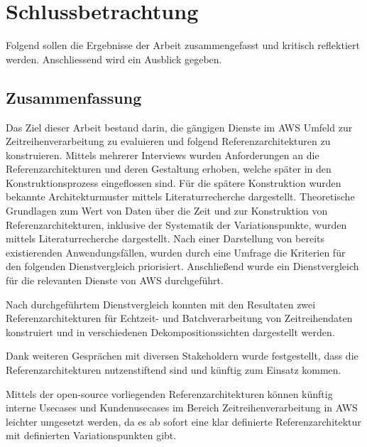 \chapter{Schlussbetrachtung}\label{chapter:Schlussbetrachtun}
Folgend sollen die Ergebnisse der Arbeit zusammengefasst und kritisch reflektiert werden. Anschliessend wird ein Ausblick gegeben.
\section{Zusammenfassung}\label{section:Zusammenfassun}
Das Ziel dieser Arbeit bestand darin, die gängigen Dienste im \ac{AWS} Umfeld zur Zeitreihenverarbeitung zu evaluieren und folgend Referenzarchitekturen zu konstruieren. Mittels mehrerer Interviews wurden Anforderungen an die Referenzarchitekturen und deren Gestaltung erhoben, welche später in den Konstruktionsprozess eingeflossen sind. 
Für die spätere Konstruktion wurden bekannte Architekturmuster mittels Literaturrecherche dargestellt. Theoretische Grundlagen zum Wert von Daten über die Zeit und zur Konstruktion von Referenzarchitekturen, inklusive der Systematik der Variationspunkte, wurden mittels Literaturrecherche dargestellt. Nach einer Darstellung von bereits existierenden Anwendungsfällen, wurden durch eine Umfrage die Kriterien für den folgenden Dienstvergleich priorisiert. Anschließend wurde ein Dienstvergleich für die relevanten Dienste von \ac{AWS} durchgeführt.

Nach durchgeführtem Dienstvergleich konnten mit den Resultaten zwei Referenzarchitekturen für Echtzeit- und Batchverarbeitung von Zeitreihendaten konstruiert und in verschiedenen Dekompositionssichten dargestellt werden.

Dank weiteren Gesprächen mit diversen Stakeholdern wurde festgestellt, dass die Referenzarchitekturen nutzenstiftend sind und künftig zum Einsatz kommen.

Mittels der open-source vorliegenden Referenzarchitekturen können künftig interne Usecases und Kundenusecases im Bereich Zeitreihenverarbeitung in \ac{AWS} leichter umgesetzt werden, da es ab sofort eine klar definierte Referenzarchitektur mit definierten Variationspunkten gibt.



